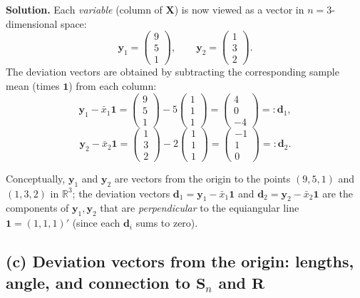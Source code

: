 \documentclass[11pt]{article}
\newcommand{\by}{\mathbf{y}}
\newcommand{\bX}{\mathbf{X}}
\newcommand{\bS}{\mathbf{S}}
\newcommand{\bd}{\mathbf{d}}
\newcommand{\bR}{\mathbf{R}}
\newcommand{\one}{\mathbf{1}}
\newenvironment{sol}{\par\noindent\textbf{Solution.}\quad}{\par\medskip}
\begin{document}
\begin{sol}
Each \emph{variable} (column of $\bX$) is now viewed as a vector in $n=3$-dimensional space:
\[
\by_1 = \begin{pmatrix}9\\5\\1\end{pmatrix}, \qquad \by_2 = \begin{pmatrix}1\\3\\2\end{pmatrix}.
\]
The deviation vectors are obtained by subtracting the corresponding sample mean (times $\one$) from each column:
\[
\by_1 - \bar x_1\one = \begin{pmatrix}9\\5\\1\end{pmatrix} - 5\begin{pmatrix}1\\1\\1\end{pmatrix} = \begin{pmatrix}4\\0\\-4\end{pmatrix} =: \bd_1,
\]
\[
\by_2 - \bar x_2\one = \begin{pmatrix}1\\3\\2\end{pmatrix} - 2\begin{pmatrix}1\\1\\1\end{pmatrix} = \begin{pmatrix}-1\\1\\0\end{pmatrix} =: \bd_2.
\]

Conceptually, $\by_1$ and $\by_2$ are vectors from the origin to the points $(9,5,1)$ and $(1,3,2)$ in $\mathbb{R}^3$; the deviation vectors $\bd_1=\by_1-\bar x_1\one$ and $\bd_2=\by_2-\bar x_2\one$ are the components of $\by_1,\by_2$ that are \emph{perpendicular} to the equiangular line $\one=(1,1,1)'$ (since each $\bd_i$ sums to zero).
\end{sol}

\subsection*{(c) Deviation vectors from the origin: lengths, angle, and connection to $\bS_n$ and $\bR$}
\end{document}
